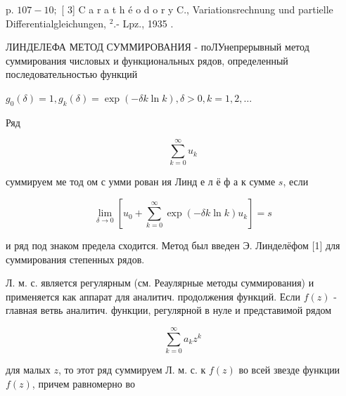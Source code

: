 \documentclass[10pt]{article}
\begin{document}
p. $107-10 ;$ [ 3] C a r a t h é o d o r y C., Variationsrechnung und partielle Differentialgleichungen, ${ }^{2}$.- Lpz., 1935 .



ЛИНДЕЛЕФА МЕТОД СУММИРОВАНИЯ - поЛУнепрерывный метод суммирования числовых и функциональных рядов, определенный последовательностью функций



$g_{0}(\delta)=1, g_{k}(\delta)=\exp (-\delta k \ln k), \delta>0, k=1,2, \ldots$



Ряд



\[

\sum_{k=0}^{\infty} u_{k}

\]



суммируем ме тод ом с умми рован ия Линд е л ё ф а к сумме $s$, если



\[

\lim _{\delta \rightarrow 0}\left[u_{0}+\sum_{k=0}^{\infty} \exp (-\delta k \ln k) u_{k}\right]=s

\]



и ряд под знаком предела сходится. Метод был введен Э. Линделёфом [1] для суммирования степенных рядов.



Л. м. с. является регулярным (см. Реаулярные методы суммирования) и применяется как аппарат для аналитич. продолжения функций. Если $f(z)$ - главная ветвь аналитич. функции, регулярной в нуле и представимой рядом



\[

\sum_{k=0}^{\infty} a_{k} z^{k}

\]



для малых $z$, то этот ряд суммируем Л. м. с. к $f(z)$ во всей звезде функции $f(z)$, причем равномерно во
\end{document}
